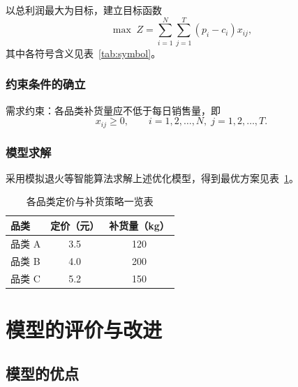 \documentclass[a4paper, zihao=-4, fontset=windows]{ctexart}
\begin{document}
以总利润最大为目标，建立目标函数
\begin{equation}
  \max \; Z = \sum_{i=1}^{N}\sum_{j=1}^{T} \left( p_i - c_i \right) x_{ij},
  \label{eq:objective}
\end{equation}
其中各符号含义见表~\ref{tab:symbol}。

\subsubsection{约束条件的确立}

需求约束：各品类补货量应不低于每日销售量，即
\begin{equation}
  x_{ij} \ge 0, \qquad i=1,2,\dots,N,\; j=1,2,\dots,T.
\end{equation}

\subsubsection{模型求解}

采用模拟退火等智能算法求解上述优化模型，得到最优方案见表~\ref{tab:result}。

\begin{table}[htbp]
  \centering
  \caption{各品类定价与补货策略一览表}
  \label{tab:result}
  \begin{tabular}{lcc}
    \toprule
    品类 & 定价（元） & 补货量（kg） \\
    \midrule
    品类 A & 3.5 & 120 \\
    品类 B & 4.0 & 200 \\
    品类 C & 5.2 & 150 \\
    \bottomrule
  \end{tabular}
\end{table}

\section{模型的评价与改进}

\subsection{模型的优点}
\end{document}
